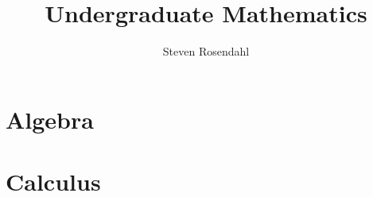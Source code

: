 \documentclass{book}
\title{Undergraduate Mathematics}
\date{}
\author{Steven Rosendahl}
\theoremstyle{plain}
\theoremstyle{defBG}
\theoremstyle{egBG}
\theoremstyle{named}
\begin{document}
\maketitle

\tableofcontents{}

\part{Algebra}



\part{Calculus}

\begin{appendices}
	
	
\end{appendices}
\end{document}
